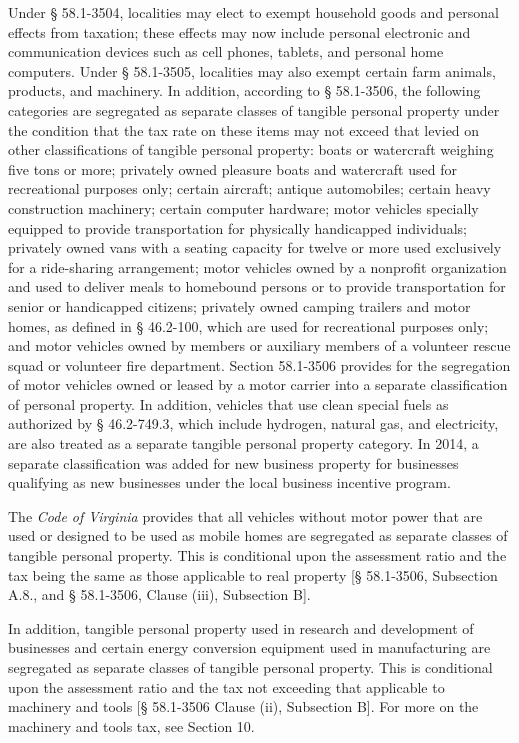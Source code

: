 \documentclass[
]{book}
\begin{document}
Under § 58.1-3504, localities may elect to exempt household goods and personal effects from taxation; these effects may now include personal electronic and communication devices such as cell phones, tablets, and personal home computers. Under § 58.1-3505, localities may also exempt certain farm animals, products, and machinery. In addition, according to § 58.1-3506, the following categories are segregated as separate classes of tangible personal property under the condition that the tax rate on these items may not exceed that levied on other classifications of tangible personal property: boats or watercraft weighing five tons or more; privately owned pleasure boats and watercraft used for recreational purposes only; certain aircraft; antique automobiles; certain heavy construction machinery; certain computer hardware; motor vehicles specially equipped to provide transportation for physically handicapped individuals; privately owned vans with a seating capacity for twelve or more used exclusively for a ride-sharing arrangement; motor vehicles owned by a nonprofit organization and used to deliver meals to homebound persons or to provide transportation for senior or handicapped citizens; privately owned camping trailers and motor homes, as defined in § 46.2-100, which are used for recreational purposes only; and motor vehicles owned by members or auxiliary members of a volunteer rescue squad or volunteer fire department. Section 58.1-3506 provides for the segregation of motor vehicles owned or leased by a motor carrier into a separate classification of personal property. In addition, vehicles that use clean special fuels as authorized by § 46.2-749.3, which include hydrogen, natural gas, and electricity, are also treated as a separate tangible personal property category. In 2014, a separate classification was added for new business property for businesses qualifying as new businesses under the local business incentive program.

The \emph{Code of Virginia} provides that all vehicles without motor power that are used or designed to be used as mobile homes are segregated as separate classes of tangible personal property. This is conditional upon the assessment ratio and the tax being the same as those applicable to real property {[}§ 58.1-3506, Subsection A.8., and § 58.1-3506, Clause (iii), Subsection B{]}.

In addition, tangible personal property used in research and development of businesses and certain energy conversion equipment used in manufacturing are segregated as separate classes of tangible personal property. This is conditional upon the assessment ratio and the tax not exceeding that applicable to machinery and tools {[}§ 58.1-3506 Clause (ii), Subsection B{]}. For more on the machinery and tools tax, see Section 10.
\end{document}
